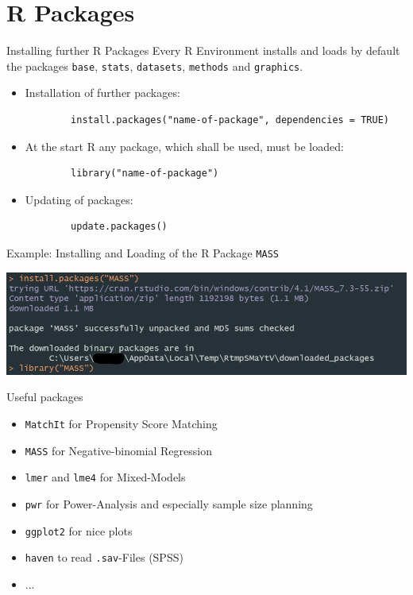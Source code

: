 \documentclass[aspectratio = 169]{chariteBeamer}
\begin{document}

	


\section{\textsf R Packages}


\begin{frame}[fragile]{Installing further \textsf R Packages}
    Every \textsf R Environment installs and loads by default the packages \texttt{base}, \texttt{stats}, \texttt{datasets}, \texttt{methods} and \texttt{graphics}.\bigskip
    \begin{itemize}
        \item Installation of further packages:
        \begin{verbatim}
        install.packages("name-of-package", dependencies = TRUE)
        \end{verbatim}
        \item At the start R any package, which shall be used, must be loaded:
        \begin{verbatim}
        library("name-of-package")
        \end{verbatim}
        \item Updating of packages:
        \begin{verbatim}
        update.packages()
        \end{verbatim}
    \end{itemize}
\end{frame}

\begin{frame}[fragile]{Example: Installing and Loading of the \textsf R Package \texttt{MASS}}
    \begin{center}
        \includegraphics[width=\textwidth, keepaspectratio]{pakete.png}
    \end{center}
\end{frame}


\begin{frame}[fragile]{Useful packages}
	\begin{itemize}
		\item \verb+MatchIt+ for Propensity Score Matching 
	          \item \verb+MASS+ for Negative-binomial Regression
	          \item \verb+lmer+ and \verb+lme4+ for Mixed-Models 
	          \item \verb+pwr+ for Power-Analysis and especially sample size planning
	          \item \verb+ggplot2+ for nice plots
	          \item \verb+haven+ to read \verb+.sav+-Files (SPSS)
	          \item ...
	\end{itemize}
\end{frame}
	
\end{document}
